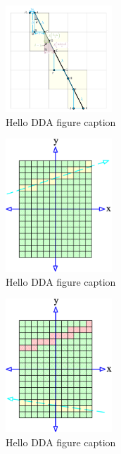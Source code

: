 	\begin{figure}
	  \centering
	  \includegraphics[width=4cm]{DDA.png}
	  \caption{Hello DDA figure caption}\label{fig:DDA-figsB}
	\end{figure}
	\begin{figure}
	  \centering
	  \includegraphics[width=4cm]{Space_Carving_1.png}
	  \caption{Hello DDA figure caption }\label{fig:SC-one-figsB}
	\end{figure}
	\begin{figure}
	  \centering
	  \includegraphics[width=4cm]{Space_Carving_2.png}
	  \caption{Hello DDA figure caption }\label{fig:SC-two-figsB}
	\end{figure}
